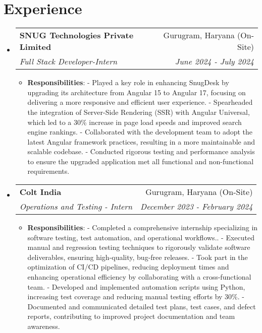 \documentclass[a4paper,22pt]{article}
\makeatletter
\newcommand{\resumeItem}[2]{
  \item\small{
    \textbf{#1}{: #2 \vspace{-2pt}}
  }
}
\newcommand{\resumeSubheading}[4]{
  \vspace{-1pt}\item
    \begin{tabular*}{0.97\textwidth}{l@{\extracolsep{\fill}}r}
      \textbf{#1} & #2 \\
      \textit{#3} & \textit{#4} \\
    \end{tabular*}\vspace{-5pt}
}
\newcommand{\resumeSubHeadingListStart}{\begin{itemize}[leftmargin=*]}
\newcommand{\resumeSubHeadingListEnd}{\end{itemize}}
\newcommand{\resumeItemListStart}{\begin{itemize}}
\newcommand{\resumeItemListEnd}{\end{itemize}\vspace{-5pt}}
\makeatother
\begin{document}
\section{Experience}
  \resumeSubHeadingListStart
    \resumeSubheading{SNUG Technologies Private Limited}{Gurugram, Haryana (On-Site)}
    {Full Stack Developer-Intern}{June 2024 - July 2024}
    \resumeItemListStart
             \resumeItem{Responsibilities}
          {\newline
          - Played a key role in enhancing SnugDesk by upgrading its architecture from Angular 15 to Angular 17, focusing on delivering a more responsive and efficient user experience. \newline
    - Spearheaded the integration of Server-Side Rendering (SSR) with Angular Universal, which led to a 30\%  increase in page load speeds and improved search engine rankings. \newline
    - Collaborated with the development team to adopt the latest Angular framework practices, resulting in a more maintainable and scalable codebase.\newline
    - Conducted rigorous testing and performance analysis to ensure the upgraded application met all functional and non-functional requirements.}
      \resumeItemListEnd
      \vspace{5pt}
       \resumeSubheading{Colt India}{Gurugram, Haryana (On-Site)}
    {Operations and Testing - Intern}{December 2023 - February 2024}
    \resumeItemListStart
             \resumeItem{Responsibilities}
          {\newline
          - Completed a comprehensive internship specializing in software testing, test automation, and operational workflows.. \newline
    - Executed manual and regression testing techniques to rigorously validate software deliverables, ensuring high-quality, bug-free releases. \newline
    - Took part in the optimization of CI/CD pipelines, reducing deployment times and enhancing operational efficiency by collaborating with a cross-functional team. \newline
    - Developed and implemented automation scripts using Python, increasing test coverage and reducing manual testing efforts by 30\%. \newline
    - Documented and communicated detailed test plans, test cases, and defect reports, contributing to improved project documentation and team awareness.}
      \resumeItemListEnd
 \vspace{5pt}
\resumeSubHeadingListEnd
\vspace{-5pt}
\vspace{-5pt}
\end{document}
